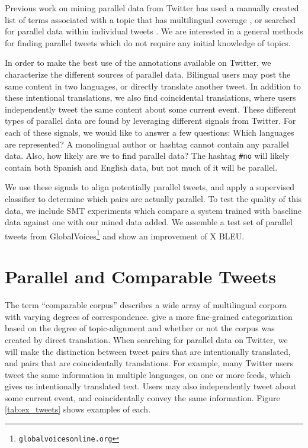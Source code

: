 \documentclass[11pt,letterpaper]{article}
\begin{document}
Previous work on mining parallel data from Twitter has used a
manually created list of terms associated with a topic that has multilingual
coverage \cite{Jehl12}, or searched for parallel
data within individual tweets \cite{Ling13}. We are interested in a general
methods for finding parallel tweets which do not require any initial knowledge
of topics.

In order to make the best use of the annotations available on Twitter, we
characterize the different sources of parallel data. Bilingual users may post
the same content in two languages, or directly translate another tweet. In
addition to these intentional translations, we also find coincidental
translations, where users independently tweet the same content about some
current event. These different types of parallel data are found by leveraging
different signals from Twitter. For each of these signals, we would like to
answer a few questions: Which languages are represented? A monolingual author or
hashtag cannot contain any parallel data. Also, how likely are we to
find parallel data? The hashtag {\tt \#no} will likely contain both Spanish and
English data, but not much of it will be parallel.

We use these signals to align potentially parallel tweets, and apply a
supervised classifier \cite{Munteanu05} to determine which pairs are actually parallel.
To test the quality of this data, we include SMT experiments which compare a
system trained with baseline data against one with our mined data added. We
assemble a test set of parallel tweets from GlobalVoices\footnote{{\tt globalvoicesonline.org}}
and show an improvement of X BLEU.

\section{Parallel and Comparable Tweets}
The term ``comparable corpus'' describes a wide array of multilingual corpora with varying
degrees of correspondence.  give a more fine-grained
categorization based on the degree of topic-alignment and whether or not the
corpus was created by direct translation. When searching for parallel data on
Twitter, we will make the distinction between tweet pairs that are intentionally
translated, and pairs that are coincidentally translations. For example, many
Twitter users tweet the same information in multiple languages, on one or more
feeds, which gives us intentionally translated text. Users may also
independently tweet about some current event, and coincidentally convey the same
information. Figure \ref{tab:ex_tweets} shows examples of each.
\end{document}
